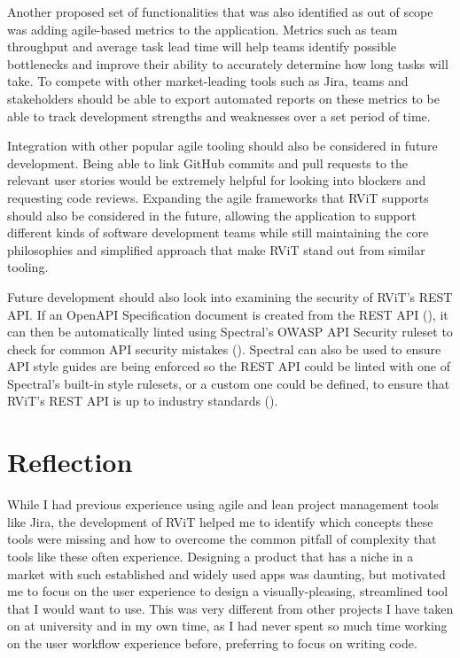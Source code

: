 \documentclass[l4proj.tex]{subfiles}
\begin{document}
Another proposed set of functionalities that was also identified as out of scope was adding agile-based metrics to the application. Metrics such as team throughput and average task lead time will help teams identify possible bottlenecks and improve their ability to accurately determine how long tasks will take. To compete with other market-leading tools such as Jira, teams and stakeholders should be able to export automated reports on these metrics to be able to track development strengths and weaknesses over a set period of time. 

Integration with other popular agile tooling should also be considered in future development. Being able to link GitHub commits and pull requests to the relevant user stories would be extremely helpful for looking into blockers and requesting code reviews. Expanding the agile frameworks that RViT supports should also be considered in the future, allowing the application to support different kinds of software development teams while still maintaining the core philosophies and simplified approach that make RViT stand out from similar tooling.  

Future development should also look into examining the security of RViT's REST API. If an OpenAPI Specification document is created from the REST API (\cite{OpenAPISpec}), it can then be automatically linted using Spectral's OWASP API Security ruleset to check for common API security mistakes (\cite{SpectralOWASP}). Spectral can also be used to ensure API style guides are being enforced so the REST API could be linted with one of Spectral's built-in style rulesets, or a custom one could be defined, to ensure that RViT's REST API is up to industry standards (\cite{SpectralLinting}).


\section{Reflection}
While I had previous experience using agile and lean project management tools like Jira, the development of RViT helped me to identify which concepts these tools were missing and how to overcome the common pitfall of complexity that tools like these often experience. Designing a product that has a niche in a market with such established and widely used apps was daunting, but motivated me to focus on the user experience to design a visually-pleasing, streamlined tool that I would want to use. This was very different from other projects I have taken on at university and in my own time, as I had never spent so much time working on the user workflow experience before, preferring to focus on writing code. 
\end{document}
